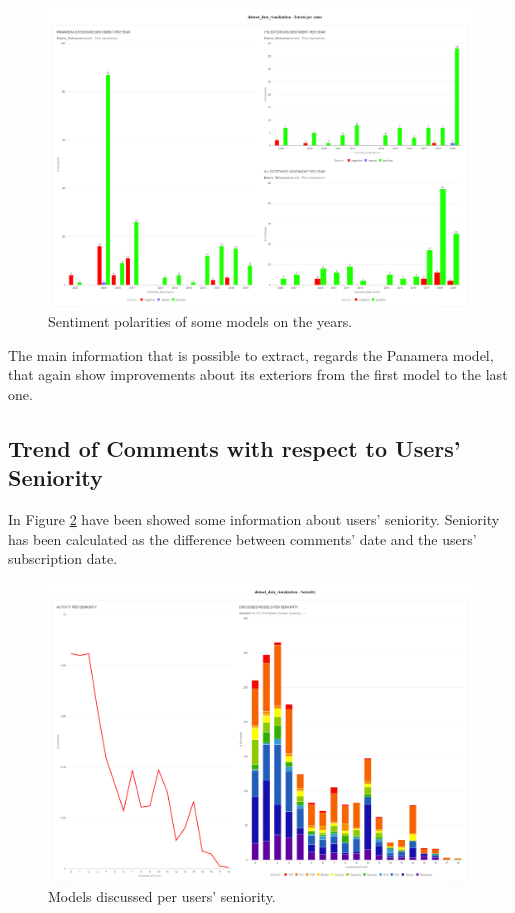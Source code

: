 \begin{figure}[H]
	\centering
	\includegraphics[width=\textwidth]{figures/odv_export/dataset_data_visualization_5.pdf}
	\caption{Sentiment polarities of some models on the years.}
	\label{fig:ext-year-snt}
\end{figure}

The main information that is possible to extract, regards the Panamera model, that again show improvements about its exteriors from the first model to the last one.



\subsection{Trend of Comments with respect to Users' Seniority}

In Figure \ref{fig:model-senior} have been showed some information about users' seniority. Seniority has been calculated as the difference between comments' date and the users' subscription date.

\begin{figure}[H]
	\centering
	\includegraphics[width=\textwidth]{figures/odv_export/dataset_data_visualization_9.pdf}
	\caption{Models discussed per users' seniority.}
	\label{fig:model-senior}
\end{figure}

